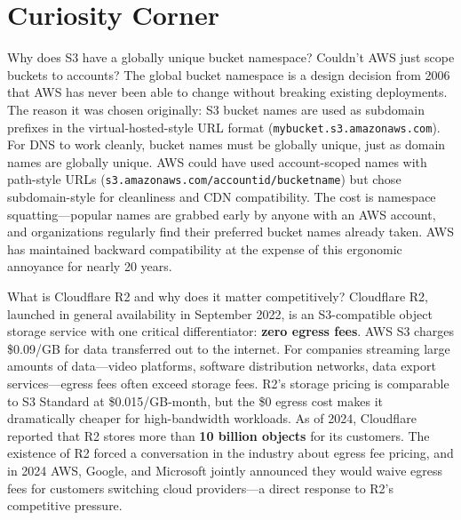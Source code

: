 \documentclass[11pt,a4paper]{article}
\begin{document}
\section{Curiosity Corner}

\begin{curiobox}{Why does S3 have a globally unique bucket namespace? Couldn't AWS just scope buckets to accounts?}
The global bucket namespace is a design decision from 2006 that AWS has never been able to change without breaking existing deployments. The reason it was chosen originally: S3 bucket names are used as subdomain prefixes in the virtual-hosted-style URL format (\texttt{mybucket.s3.amazonaws.com}). For DNS to work cleanly, bucket names must be globally unique, just as domain names are globally unique. AWS could have used account-scoped names with path-style URLs (\texttt{s3.amazonaws.com/accountid/bucketname}) but chose subdomain-style for cleanliness and CDN compatibility. The cost is namespace squatting---popular names are grabbed early by anyone with an AWS account, and organizations regularly find their preferred bucket names already taken. AWS has maintained backward compatibility at the expense of this ergonomic annoyance for nearly 20 years.
\end{curiobox}

\begin{curiobox}{What is Cloudflare R2 and why does it matter competitively?}
Cloudflare R2, launched in general availability in September 2022, is an S3-compatible object storage service with one critical differentiator: \textbf{zero egress fees}. AWS S3 charges \$0.09/GB for data transferred out to the internet. For companies streaming large amounts of data---video platforms, software distribution networks, data export services---egress fees often exceed storage fees. R2's storage pricing is comparable to S3 Standard at \$0.015/GB-month, but the \$0 egress cost makes it dramatically cheaper for high-bandwidth workloads. As of 2024, Cloudflare reported that R2 stores more than \textbf{10 billion objects} for its customers. The existence of R2 forced a conversation in the industry about egress fee pricing, and in 2024 AWS, Google, and Microsoft jointly announced they would waive egress fees for customers switching cloud providers---a direct response to R2's competitive pressure.
\end{curiobox}
\end{document}

